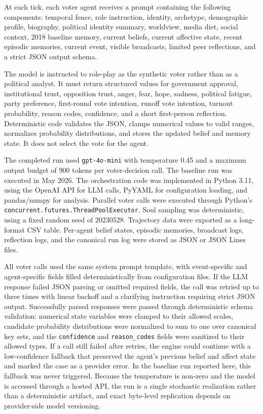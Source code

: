 \documentclass[pdflatex,sn-mathphys-num,iicol]{sn-jnl}
\begin{document}
At each tick, each voter agent receives a prompt containing the following components: temporal fence, role instruction, identity, archetype, demographic profile, biography, political identity summary, worldview, media diet, social context, 2018 baseline memory, current beliefs, current affective state, recent episodic memories, current event, visible broadcasts, limited peer reflections, and a strict JSON output schema.

The model is instructed to role-play as the synthetic voter rather than as a political analyst. It must return structured values for government approval, institutional trust, opposition trust, anger, fear, hope, sadness, political fatigue, party preference, first-round vote intention, runoff vote intention, turnout probability, reason codes, confidence, and a short first-person reflection. Deterministic code validates the JSON, clamps numerical values to valid ranges, normalizes probability distributions, and stores the updated belief and memory state. It does not select the vote for the agent.

The completed run used \texttt{gpt-4o-mini} with temperature 0.45 and a maximum output budget of 900 tokens per voter-decision call. The baseline run was executed in May 2026. The orchestration code was implemented in Python 3.11, using the OpenAI API for LLM calls, PyYAML for configuration loading, and pandas/numpy for analysis. Parallel voter calls were executed through Python's \texttt{concurrent.futures.ThreadPoolExecutor}. Soul sampling was deterministic, using a fixed random seed of 20230528. Trajectory data were exported as a long-format CSV table. Per-agent belief states, episodic memories, broadcast logs, reflection logs, and the canonical run log were stored as JSON or JSON Lines files.

All voter calls used the same system prompt template, with event-specific and agent-specific fields filled deterministically from configuration files. If the LLM response failed JSON parsing or omitted required fields, the call was retried up to three times with linear backoff and a clarifying instruction requiring strict JSON output. Successfully parsed responses were passed through deterministic schema validation: numerical state variables were clamped to their allowed scales, candidate probability distributions were normalized to sum to one over canonical key sets, and the \texttt{confidence} and \texttt{reason\_codes} fields were sanitized to their allowed types. If a call still failed after retries, the engine could continue with a low-confidence fallback that preserved the agent's previous belief and affect state and marked the case as a provider error. In the baseline run reported here, this fallback was never triggered. Because the temperature is non-zero and the model is accessed through a hosted API, the run is a single stochastic realization rather than a deterministic artifact, and exact byte-level replication depends on provider-side model versioning.
\end{document}
